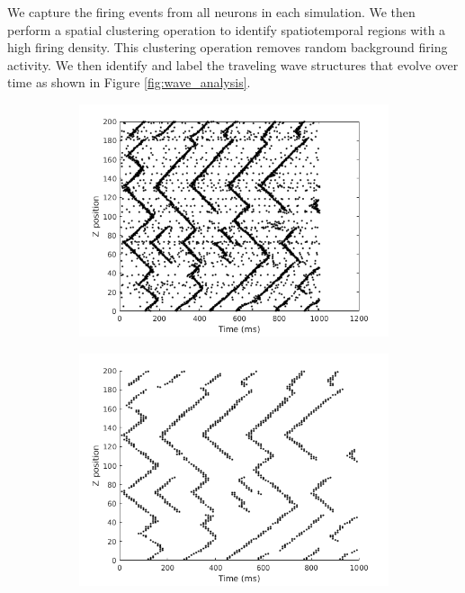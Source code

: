 \documentclass[a4paper,11pt]{article}
\begin{document}
We capture the firing events from all neurons in each simulation.
We then perform a spatial clustering operation to identify spatiotemporal regions with a high firing density.
This clustering operation removes random background firing activity.
We then identify and label the traveling wave structures that evolve over time as shown in Figure \ref{fig:wave_analysis}.
\begin{figure}[!htb]
 \centering
 \begin{subfigure}{0.33\textwidth}
  \centering
  \includegraphics[width=\textwidth]{fig/2x2_firings}
 \end{subfigure}%
 \begin{subfigure}{0.33\textwidth}
  \centering
  \includegraphics[width=\textwidth]{fig/2x2_density_filter}

\end{subfigure}
\end{figure}
\end{document}
